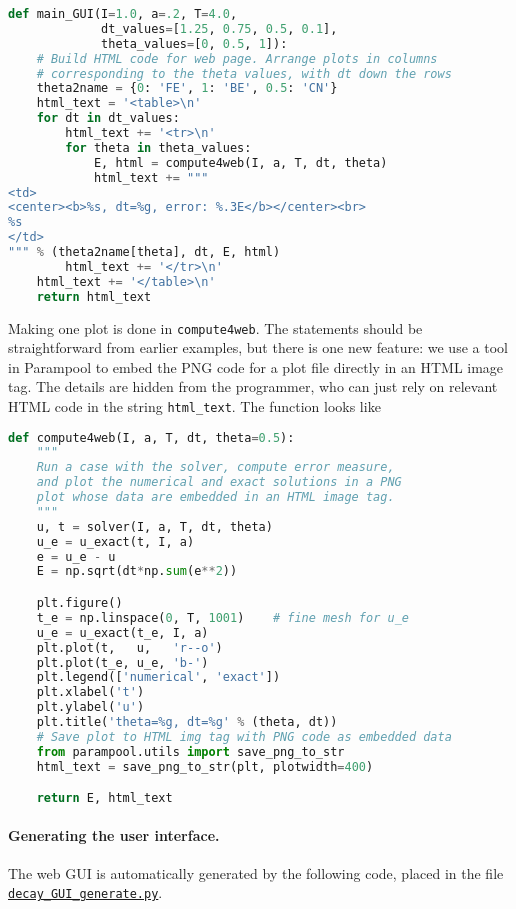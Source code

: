 \documentclass[graybox,sectrefs,envcountresetchap,open=right,final]{svmonodo}
\begin{document}
\begin{lstlisting}[language=Python,style=blue1_bluegreen]
def main_GUI(I=1.0, a=.2, T=4.0,
             dt_values=[1.25, 0.75, 0.5, 0.1],
             theta_values=[0, 0.5, 1]):
    # Build HTML code for web page. Arrange plots in columns
    # corresponding to the theta values, with dt down the rows
    theta2name = {0: 'FE', 1: 'BE', 0.5: 'CN'}
    html_text = '<table>\n'
    for dt in dt_values:
        html_text += '<tr>\n'
        for theta in theta_values:
            E, html = compute4web(I, a, T, dt, theta)
            html_text += """
<td>
<center><b>%s, dt=%g, error: %.3E</b></center><br>
%s
</td>
""" % (theta2name[theta], dt, E, html)
        html_text += '</tr>\n'
    html_text += '</table>\n'
    return html_text
\end{lstlisting}

Making one plot is done in \texttt{compute4web}. The statements should be
straightforward from earlier examples, but there is one new feature:
we use a tool in Parampool to embed the PNG code for a plot file
directly in an HTML image tag. The details are hidden from the
programmer, who can just rely on
relevant HTML code in the string \Verb!html_text!. The function looks like

\begin{lstlisting}[language=Python,style=blue1_bluegreen]
def compute4web(I, a, T, dt, theta=0.5):
    """
    Run a case with the solver, compute error measure,
    and plot the numerical and exact solutions in a PNG
    plot whose data are embedded in an HTML image tag.
    """
    u, t = solver(I, a, T, dt, theta)
    u_e = u_exact(t, I, a)
    e = u_e - u
    E = np.sqrt(dt*np.sum(e**2))

    plt.figure()
    t_e = np.linspace(0, T, 1001)    # fine mesh for u_e
    u_e = u_exact(t_e, I, a)
    plt.plot(t,   u,   'r--o')
    plt.plot(t_e, u_e, 'b-')
    plt.legend(['numerical', 'exact'])
    plt.xlabel('t')
    plt.ylabel('u')
    plt.title('theta=%g, dt=%g' % (theta, dt))
    # Save plot to HTML img tag with PNG code as embedded data
    from parampool.utils import save_png_to_str
    html_text = save_png_to_str(plt, plotwidth=400)

    return E, html_text
\end{lstlisting}


\paragraph{Generating the user interface.}
The web GUI is automatically generated by
the following code, placed in the file \href{{http://tinyurl.com/ofkw6kc/softeng/decay_GUI_generate.py}}{\nolinkurl{decay_GUI_generate.py}}.
\end{document}

